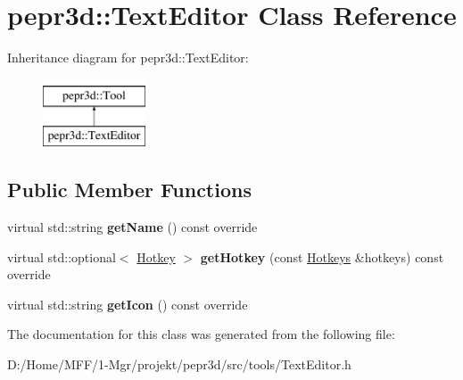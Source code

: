 \hypertarget{classpepr3d_1_1_text_editor}{}\section{pepr3d\+::Text\+Editor Class Reference}
\label{classpepr3d_1_1_text_editor}
Inheritance diagram for pepr3d\+::Text\+Editor\+:\begin{figure}[H]
\begin{center}
\leavevmode
\includegraphics[height=2.000000cm]{classpepr3d_1_1_text_editor}
\end{center}
\end{figure}
\subsection*{Public Member Functions}
\begin{DoxyCompactItemize}
\item 
\mbox{\label{classpepr3d_1_1_text_editor_a89d5554aba18be49d5e8f13c1729e3b0}} 
virtual std\+::string {\bfseries get\+Name} () const override
\item 
\mbox{\label{classpepr3d_1_1_text_editor_a45e0186c35d934adc4af68640074d44e}} 
virtual std\+::optional$<$ \mbox{\hyperlink{structpepr3d_1_1_hotkey}{Hotkey}} $>$ {\bfseries get\+Hotkey} (const \mbox{\hyperlink{classpepr3d_1_1_hotkeys}{Hotkeys}} \&hotkeys) const override
\item 
\mbox{\label{classpepr3d_1_1_text_editor_ad7adaa2d3f7104bface2115407ea3ef3}} 
virtual std\+::string {\bfseries get\+Icon} () const override
\end{DoxyCompactItemize}


The documentation for this class was generated from the following file\+:\begin{DoxyCompactItemize}
\item 
D\+:/\+Home/\+M\+F\+F/1-\/\+Mgr/projekt/pepr3d/src/tools/Text\+Editor.\+h\end{DoxyCompactItemize}
